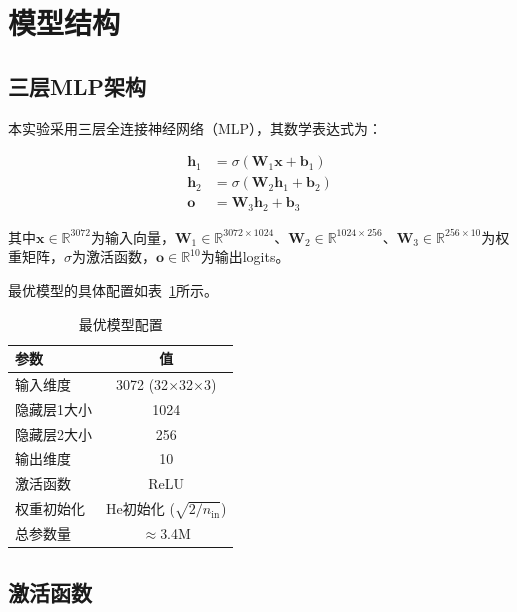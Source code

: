 \documentclass[12pt,a4paper]{article}
\begin{document}
\section{模型结构}

\subsection{三层MLP架构}

本实验采用三层全连接神经网络（MLP），其数学表达式为：

\begin{align}
    \mathbf{h}_1 &= \sigma(\mathbf{W}_1 \mathbf{x} + \mathbf{b}_1) \\
    \mathbf{h}_2 &= \sigma(\mathbf{W}_2 \mathbf{h}_1 + \mathbf{b}_2) \\
    \mathbf{o} &= \mathbf{W}_3 \mathbf{h}_2 + \mathbf{b}_3
\end{align}

其中$\mathbf{x} \in \mathbb{R}^{3072}$为输入向量，$\mathbf{W}_1 \in \mathbb{R}^{3072 \times 1024}$、$\mathbf{W}_2 \in \mathbb{R}^{1024 \times 256}$、$\mathbf{W}_3 \in \mathbb{R}^{256 \times 10}$为权重矩阵，$\sigma$为激活函数，$\mathbf{o} \in \mathbb{R}^{10}$为输出logits。

最优模型的具体配置如表~\ref{tab:model_config}所示。

\begin{table}[H]
\centering
\caption{最优模型配置}
\label{tab:model_config}
\begin{tabular}{lc}
\toprule
\textbf{参数} & \textbf{值} \\
\midrule
输入维度 & 3072 (32$\times$32$\times$3) \\
隐藏层1大小 & 1024 \\
隐藏层2大小 & 256 \\
输出维度 & 10 \\
激活函数 & ReLU \\
权重初始化 & He初始化 ($\sqrt{2/n_{\text{in}}}$) \\
总参数量 & $\approx$3.4M \\
\bottomrule
\end{tabular}
\end{table}

\subsection{激活函数}
\end{document}
